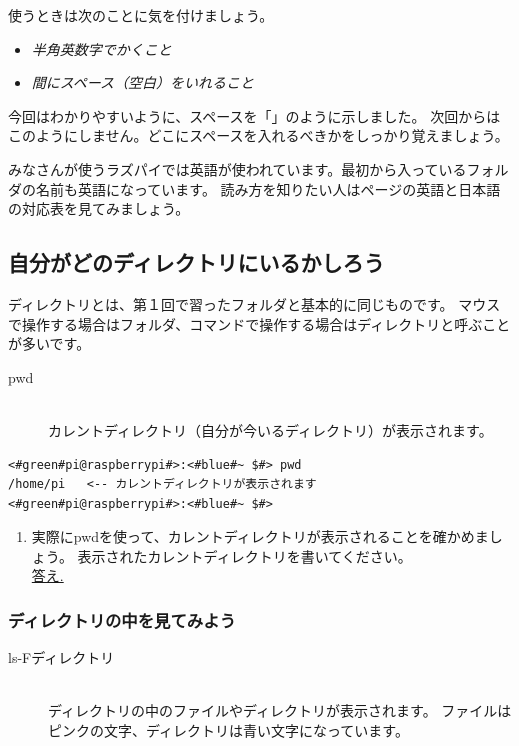 使うときは次のことに気を付けましょう。
\begin{itemize}
\item \emph{半角英数字でかくこと}
\item \emph{間にスペース（空白）をいれること}
\end{itemize}

今回はわかりやすいように、スペースを「\textvisiblespace 」のように示しました。
次回からはこのようにしません。どこにスペースを入れるべきかをしっかり覚えましょう。

みなさんが使うラズパイでは英語が使われています。最初から入っているフォルダの名前も英語になっています。
読み方を知りたい人は\pageref{英語と日本語の対応表}ページの英語と日本語の対応表を見てみましょう。

\subsection{自分がどのディレクトリにいるかしろう}
ディレクトリとは、第１回で習ったフォルダと基本的に同じものです。
マウスで操作する場合はフォルダ、コマンドで操作する場合はディレクトリと呼ぶことが多いです。

\begin{description}
\item[pwd]\mbox{}\\
 カレントディレクトリ（自分が今いるディレクトリ）が表示されます。
\end{description}

\begin{lstlisting}[caption=pwdコマンドの例,label=pwdtest]
<#green#pi@raspberrypi#>:<#blue#~ $#> pwd
/home/pi   <-- カレントディレクトリが表示されます
<#green#pi@raspberrypi#>:<#blue#~ $#>
\end{lstlisting}

\begin{tcolorbox}[title=\useOmetoi]
\begin{enumerate}
 \item 実際にpwdを使って、カレントディレクトリが表示されることを確かめましょう。
 表示されたカレントディレクトリを書いてください。\\
\underline{答え.\hspace{0.8\linewidth}}
\end{enumerate}
\end{tcolorbox}



\subsubsection{ディレクトリの中を見てみよう}
\begin{description}
\item[ls\textvisiblespace -F\textvisiblespace ディレクトリ]\mbox{}\\
ディレクトリの中のファイルやディレクトリが表示されます。
ファイルはピンクの文字、ディレクトリは青い文字になっています。
\end{description}

